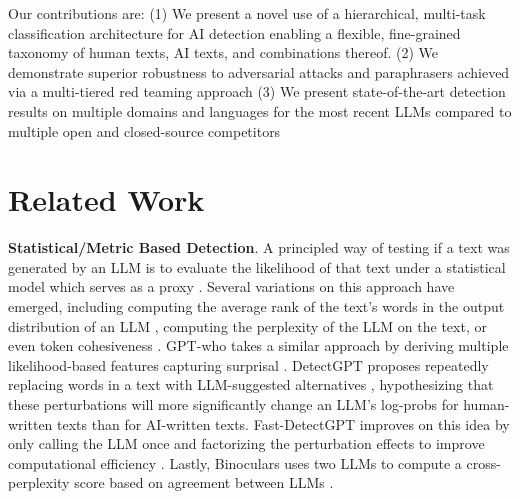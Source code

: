 \documentclass[11pt]{article}
\begin{document}
Our contributions are:
    (1) We present a novel use of a hierarchical, multi-task classification architecture for AI detection enabling a flexible, fine-grained taxonomy of human texts, AI texts, and combinations thereof. 
    (2) We demonstrate superior robustness to adversarial attacks and paraphrasers achieved via a multi-tiered red teaming approach
    (3) We present state-of-the-art detection results on multiple domains and languages for the most recent LLMs compared to multiple open and closed-source competitors



\section{Related Work}
\label{sec:related}

{\bf Statistical/Metric Based Detection}. A principled way of testing if a text was generated by an LLM is to evaluate the likelihood of that text under a statistical model which serves as a proxy \cite{Su2023-de}. 
Several variations on this approach have emerged, including computing the average rank of the text's words in the output distribution of an LLM \cite{Su2023-de}, computing the perplexity of the LLM on the text, or even token cohesiveness \cite{Ma2024-wz}.
GPT-who takes a similar approach by deriving multiple likelihood-based features capturing surprisal \cite{Venkatraman2023-pe}. 
DetectGPT proposes repeatedly replacing words in a text with LLM-suggested alternatives \cite{Mitchell2023-qb}, hypothesizing that these perturbations will more significantly change an LLM's log-probs for human-written texts than for AI-written texts. 
Fast-DetectGPT improves on this idea by only calling the LLM once and factorizing the perturbation effects to improve computational efficiency \cite{Bao2023-ay}. 
Lastly, Binoculars uses two LLMs to compute a cross-perplexity score based on agreement between LLMs \cite{Hans2024-qb}.
\end{document}
